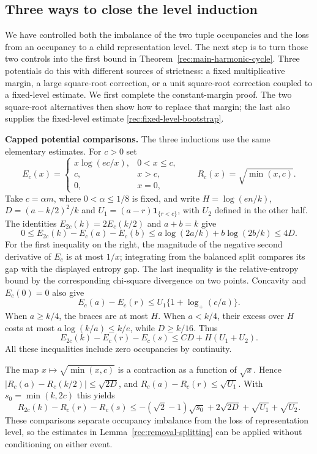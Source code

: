 \subsection{Three ways to close the level induction}
We have controlled both the imbalance of the two tuple occupancies and
the loss from an occupancy to a child representation level.  The next step
is to turn those two controls into the first bound in
Theorem~\ref{rec:main-harmonic-cycle}.  Three potentials do this with
different sources of strictness: a fixed multiplicative margin, a large
square-root correction, or a unit square-root correction coupled to a
fixed-level estimate.  We first complete the constant-margin proof.
The two square-root alternatives then show how to replace that margin;
the last also supplies the fixed-level estimate
\eqref{rec:fixed-level-bootstrap}.

\medskip\noindent\textbf{Capped potential comparisons.}\enspace
The three inductions use the same elementary estimates.  For $c>0$ set
\[
 E_c(x)=\begin{cases}x\log(ec/x),&0<x\le c,\\c,&x>c,\\0,&x=0,
 \end{cases}
 \qquad R_c(x)=\sqrt{\min(x,c)}.
\]
Take $c=\alpha m$, where $0<\alpha\le1/8$ is fixed, and write
$H=\log(en/k)$, $D=(a-k/2)^2/k$ and
$U_1=(a-r)\mathbf1_{\{r<c\}}$, with $U_2$ defined in the other half.
The identities $E_{2c}(k)=2E_c(k/2)$ and $a+b=k$ give
\[
 0\le E_{2c}(k)-E_c(a)-E_c(b)
 \le a\log(2a/k)+b\log(2b/k)\le4D.
\]
For the first inequality on the right, the magnitude of the negative
second derivative of $E_c$ is at most $1/x$; integrating from the
balanced split compares its gap with the displayed entropy gap.
The last inequality is the relative-entropy bound by the corresponding
chi-square divergence on two points.  Concavity and $E_c(0)=0$ also give
\[
 E_c(a)-E_c(r)
 \le U_1\{1+\log_+(c/a)\}.
\]
When $a\ge k/4$, the braces are at most $H$.  When $a<k/4$, their
excess over $H$ costs at most $a\log(k/a)\le k/e$, while
$D\ge k/16$.  Thus
\begin{equation}\label{rec:capped-entropy-comparison}
 E_{2c}(k)-E_c(r)-E_c(s)\le C D+H(U_1+U_2).
\end{equation}
All these inequalities include zero occupancies by continuity.

The map $x\mapsto\sqrt{\min(x,c)}$ is a contraction as a function
of $\sqrt x$.  Hence
$|R_c(a)-R_c(k/2)|\le\sqrt{2D}$, and
$R_c(a)-R_c(r)\le\sqrt{U_1}$.  With $s_0=\min(k,2c)$ this yields
\begin{equation}\label{rec:capped-root-comparison}
 R_{2c}(k)-R_c(r)-R_c(s)
 \le-(\sqrt2-1)\sqrt{s_0}+2\sqrt{2D}
                              +\sqrt{U_1}+\sqrt{U_2}.
\end{equation}
These comparisons separate occupancy imbalance from the loss of
representation level, so the estimates in Lemma~\ref{rec:removal-splitting}
can be applied without conditioning on either event.

